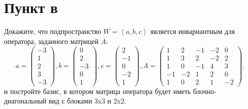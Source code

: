 \documentclass[12pt]{article}
\begin{document}
    \section*{Пункт в}
    Докажите, что подпространство $W = \left < a, b, c \right >$ является инвариантным для оператора, заданного матрицей $A$:
    \[
        a  = \begin{pmatrix}
                 -3 \\ 1 \\ 2 \\ 3 \\ -3
        \end{pmatrix} ,
        b = \begin{pmatrix}
                0 \\ 2 \\ -3 \\ 0 \\ 1
        \end{pmatrix},
        c = \begin{pmatrix}
                2 \\ -1 \\ 0 \\ -2 \\ 1
        \end{pmatrix},
        A =
        \begin{pmatrix}
            1 & 2 & -1 & -2 & 0 \\
            1 & 3 & 2 & -2 & 2 \\
            1 & 0 & -1 & 4 & 3 \\
            -1 & -2 & 1 & 2 & 0 \\
            1 & 0 & 2 & 1 & -2
        \end{pmatrix}
        .
    \]
    и постройте базис, в котором матрица оператора будет иметь блочно-диагональный вид с блоками 3x3 и 2x2.
\end{document}
